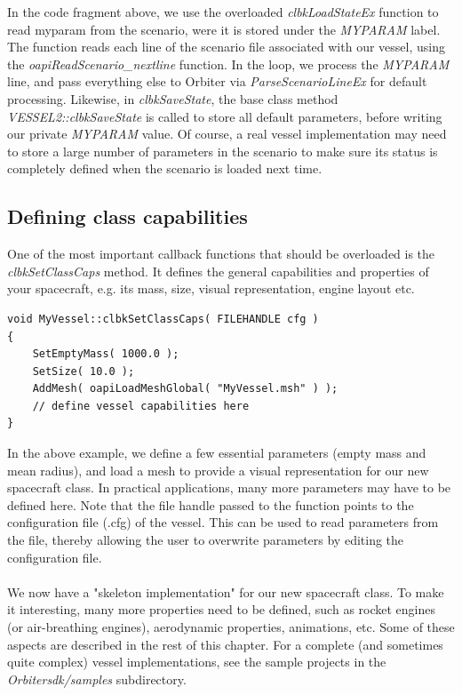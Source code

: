 \documentclass[Orbiter Developer Manual.tex]{subfiles}
\begin{document}
\noindent
In the code fragment above, we use the overloaded \textit{clbkLoadStateEx} function to read myparam from the scenario, were it is stored under the \textit{MYPARAM} label. The function reads each line of the scenario file associated with our vessel, using the \textit{oapiReadScenario\_nextline} function. In the loop, we process the \textit{MYPARAM} line, and pass everything else to Orbiter via \textit{ParseScenarioLineEx} for default processing. Likewise, in \textit{clbkSaveState}, the base class method \textit{VESSEL2::clbkSaveState} is called to store all default parameters, before writing our private \textit{MYPARAM} value. Of course, a real vessel implementation may need to store a large number of parameters in the scenario to make sure its status is completely defined when the scenario is loaded next time.


\subsection{Defining class capabilities}
One of the most important callback functions that should be overloaded is the \textit{clbkSetClassCaps} method. It defines the general capabilities and properties of your spacecraft, e.g. its mass, size, visual representation, engine layout etc.

\begin{lstlisting}
void MyVessel::clbkSetClassCaps( FILEHANDLE cfg )
{
	SetEmptyMass( 1000.0 );
	SetSize( 10.0 );
	AddMesh( oapiLoadMeshGlobal( "MyVessel.msh" ) );
	// define vessel capabilities here
}
\end{lstlisting}

\noindent
In the above example, we define a few essential parameters (empty mass and mean radius), and load a mesh to provide a visual representation for our new spacecraft class. In practical applications, many more parameters may have to be defined here. Note that the file handle passed to the function points to the configuration file (.cfg) of the vessel. This can be used to read parameters from the file, thereby allowing the user to overwrite parameters by editing the configuration file.\\
\\
We now have a "skeleton implementation" for our new spacecraft class. To make it interesting, many more properties need to be defined, such as rocket engines (or air-breathing engines), aerodynamic properties, animations, etc. Some of these aspects are described in the rest of this chapter. For a complete (and sometimes quite complex) vessel implementations, see the sample projects in the \textit{Orbitersdk/samples} subdirectory.
\end{document}
